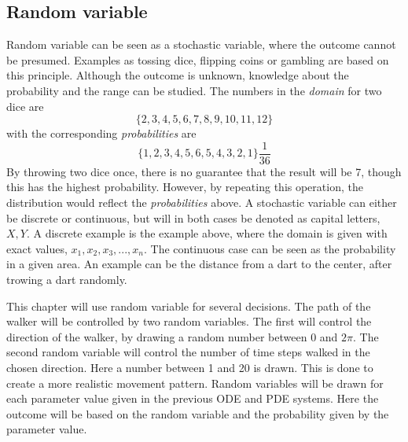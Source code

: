 \documentclass[%
twoside,                 %
final,                   %
chapterprefix=true,      %
open=right               %
10pt]{book}
\begin{document}
\subsection{Random variable}
Random variable can be seen as a stochastic variable, where the outcome cannot be presumed. Examples as tossing dice, flipping coins or gambling are based on this principle. Although the outcome is unknown, knowledge about the probability and the range can be studied. The numbers in the \emph{domain} for two dice are
\begin{equation*}
\{2,3,4,5,6,7,8,9,10,11,12\}
\end{equation*}
with the corresponding \emph{probabilities} are
\begin{equation*}
\{1,2,3,4,5,6,5,4,3,2,1\}\frac{1}{36}
\end{equation*}
By throwing two dice once, there is no guarantee that the result will be 7, though this has the highest probability. However, by repeating this operation, the distribution would reflect the \emph{probabilities} above. A stochastic variable can either be discrete or continuous, but will in both cases be denoted as capital letters, $X,Y$. A discrete example is the example above, where the domain is given with exact values, ${x_1,x_2,x_3,...,x_n}$. The continuous case can be seen as the probability in a given area. An example can be the distance from a dart to the center, after trowing a dart randomly.


\vspace{3mm}




\vspace{3mm}


This chapter will use random variable for several decisions. The path of the walker will be controlled by two random variables. The first will control the direction of the walker, by drawing a random number between $0$ and $2\pi$. The second random variable will control the number of time steps walked in the chosen direction. Here a number between 1 and 20 is drawn. This is done to create a more realistic movement pattern. Random variables will be drawn for each parameter value given in the previous ODE and PDE systems. Here the outcome will be based on the random variable and the probability given by the parameter value. 
\end{document}
